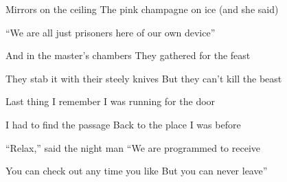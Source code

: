 \zs
Mirrors on the ceiling
The pink champagne on ice (and she said)

``We are all just prisoners here of our own device''

And in the master's chambers
They gathered for the feast

They stab it with their steely knives
But they can't kill the beast
\ks

\zs
Last thing I remember
I was running for the door

I had to find the passage
Back to the place I was before

``Relax,'' said the night man
``We are programmed to receive

You can check out any time you like
But you can never leave''
\ks

\kp
